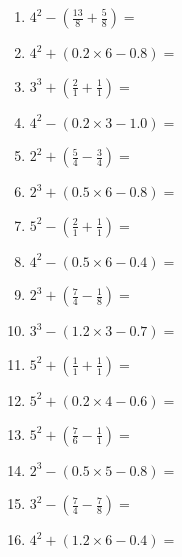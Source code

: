 \documentclass[12pt]{article}
\begin{document}
\begin{enumerate}
\item \large $ 4^{2} - (\frac{13}{8} + \frac{5}{8}) = $ \vspace{1.6cm}
\item \large $ 4^{2} + (0.2 \times 6 - 0.8) = $ \vspace{1.6cm}
\item \large $ 3^{3} + (\frac{2}{1} + \frac{1}{1}) = $ \vspace{1.6cm}
\item \large $ 4^{2} - (0.2 \times 3 - 1.0) = $ \vspace{1.6cm}
\item \large $ 2^{2} + (\frac{5}{4} - \frac{3}{4}) = $ \vspace{1.6cm}
\item \large $ 2^{3} + (0.5 \times 6 - 0.8) = $ \vspace{1.6cm}
\newpage
\item \large $ 5^{2} - (\frac{2}{1} + \frac{1}{1}) = $ \vspace{1.6cm}
\item \large $ 4^{2} - (0.5 \times 6 - 0.4) = $ \vspace{1.6cm}
\item \large $ 2^{3} + (\frac{7}{4} - \frac{1}{8}) = $ \vspace{1.6cm}
\item \large $ 3^{3} - (1.2 \times 3 - 0.7) = $ \vspace{1.6cm}
\item \large $ 5^{2} + (\frac{1}{1} + \frac{1}{1}) = $ \vspace{1.6cm}
\item \large $ 5^{2} + (0.2 \times 4 - 0.6) = $ \vspace{1.6cm}
\item \large $ 5^{2} + (\frac{7}{6} - \frac{1}{1}) = $ \vspace{1.6cm}
\item \large $ 2^{3} - (0.5 \times 5 - 0.8) = $ \vspace{1.6cm}
\item \large $ 3^{2} - (\frac{7}{4} - \frac{7}{8}) = $ \vspace{1.6cm}
\item \large $ 4^{2} + (1.2 \times 6 - 0.4) = $ \vspace{1.6cm}
\end{enumerate}\newpage
\end{document}
